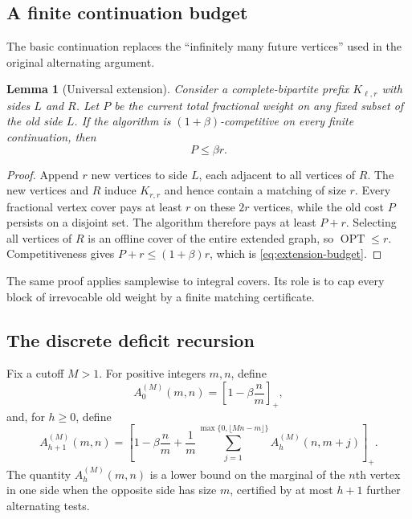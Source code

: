 \documentclass[11pt,letterpaper]{article}
\newcommand{\cref}[1]{\autoref{#1}}
\newtheorem{lemma}[theorem]{Lemma}
\theoremstyle{definition}
\theoremstyle{remark}
\newcommand{\OPT}{\operatorname{OPT}}
\newcommand{\pos}[1]{\left[#1\right]_{+}}
\begin{document}
\subsection{A finite continuation budget}

The basic continuation replaces the ``infinitely many future vertices'' used in the original alternating argument.

\begin{lemma}[Universal extension]\label{lem:universal-extension}
Consider a complete-bipartite prefix $K_{\ell,r}$ with sides $L$ and $R$.
Let $P$ be the current total fractional weight on any fixed subset of the old side $L$.
If the algorithm is $(1+\beta)$-competitive on every finite continuation, then
\begin{equation}\label{eq:extension-budget} P\le\beta r. \end{equation}
\end{lemma}

\begin{proof}
Append $r$ new vertices to side $L$, each adjacent to all vertices of $R$.
The new vertices and $R$ induce $K_{r,r}$ and hence contain a matching of size $r$.
Every fractional vertex cover pays at least $r$ on these $2r$ vertices, while the old cost $P$ persists on a disjoint set.
The algorithm therefore pays at least $P+r$.
Selecting all vertices of $R$ is an offline cover of the entire extended graph, so $\OPT\le r$.
Competitiveness gives $P+r\le(1+\beta)r$, which is \cref{eq:extension-budget}.
\end{proof}

The same proof applies samplewise to integral covers.
Its role is to cap every block of irrevocable old weight by a finite matching certificate.

\subsection{The discrete deficit recursion}

Fix a cutoff $M>1$.
For positive integers $m,n$, define
\begin{equation}\label{eq:discrete-base} A_0^{(M)}(m,n)=\pos{1-\beta\frac{n}{m}}, \end{equation}
and, for $h\ge0$, define
\begin{equation}\label{eq:discrete-recursion} A_{h+1}^{(M)}(m,n)=\pos{1-\beta\frac{n}{m}+\frac{1}{m}\sum_{j=1}^{\max\{0,\lfloor Mn-m\rfloor\}}A_h^{(M)}(n,m+j)}. \end{equation}
The quantity $A_h^{(M)}(m,n)$ is a lower bound on the marginal of the $n$th vertex in one side when the opposite side has size $m$, certified by at most $h+1$ further alternating tests.
\end{document}
